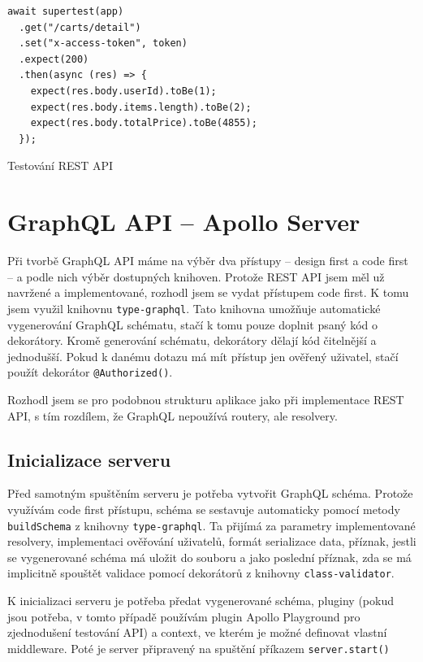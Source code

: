 \documentclass[thesis=M,czech]{FITthesis}[2019/12/23]
\begin{document}
\begin{listing}[H]
\begin{verbatim}
await supertest(app)
  .get("/carts/detail")
  .set("x-access-token", token)
  .expect(200)
  .then(async (res) => {
    expect(res.body.userId).toBe(1);
    expect(res.body.items.length).toBe(2);
    expect(res.body.totalPrice).toBe(4855);
  });
\end{verbatim}
\caption{Testování REST API}
\label{lst:test_rest}
\end{listing}


\section{GraphQL API -- Apollo Server}
Při tvorbě GraphQL API máme na výběr dva přístupy -- design first a code first -- a podle nich výběr dostupných knihoven. Protože REST API jsem měl už navržené a implementované, rozhodl jsem se vydat přístupem code first. K tomu jsem využil knihovnu \texttt{type-graphql}. Tato knihovna umožňuje automatické vygenerování GraphQL schématu, stačí k tomu pouze doplnit psaný kód o dekorátory. Kromě generování schématu, dekorátory dělají kód čitelnější a jednodušší. Pokud k danému dotazu má mít přístup jen ověřený uživatel, stačí použít dekorátor \texttt{@Authorized()}.

Rozhodl jsem se pro podobnou strukturu aplikace jako při implementace REST API, s tím rozdílem, že GraphQL nepoužívá routery, ale resolvery.

\subsection{Inicializace serveru}
Před samotným spuštěním serveru je potřeba vytvořit GraphQL schéma. Protože využívám code first přístupu, schéma se sestavuje automaticky pomocí metody \texttt{buildSchema} z knihovny \texttt{type-graphql}. Ta přijímá za parametry implementované resolvery, implementaci ověřování uživatelů, formát serializace data, příznak, jestli se vygenerované schéma má uložit do souboru a jako poslední příznak, zda se má implicitně spouštět validace pomocí dekorátorů z knihovny \texttt{class-validator}.

K inicializaci serveru je potřeba předat vygenerované schéma, pluginy (pokud jsou potřeba, v tomto případě používám plugin Apollo Playground pro zjednodušení testování API) a context, ve kterém je možné definovat vlastní middleware. Poté je server připravený na spuštění příkazem \texttt{server.start()}
\end{document}
